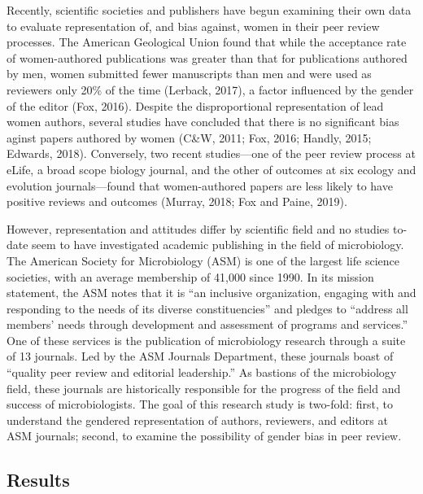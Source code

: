 \documentclass[11pt,]{article}
\begin{document}
Recently, scientific societies and publishers have begun examining their
own data to evaluate representation of, and bias against, women in their
peer review processes. The American Geological Union found that while
the acceptance rate of women-authored publications was greater than that
for publications authored by men, women submitted fewer manuscripts than
men and were used as reviewers only 20\% of the time (Lerback, 2017), a
factor influenced by the gender of the editor (Fox, 2016). Despite the
disproportional representation of lead women authors, several studies
have concluded that there is no significant bias aginst papers authored
by women (C\&W, 2011; Fox, 2016; Handly, 2015; Edwards, 2018).
Conversely, two recent studies---one of the peer review process at
eLife, a broad scope biology journal, and the other of outcomes at six
ecology and evolution journals---found that women-authored papers are
less likely to have positive reviews and outcomes (Murray, 2018; Fox and
Paine, 2019).

However, representation and attitudes differ by scientific field and no
studies to-date seem to have investigated academic publishing in the
field of microbiology. The American Society for Microbiology (ASM) is
one of the largest life science societies, with an average membership of
41,000 since 1990. In its mission statement, the ASM notes that it is
``an inclusive organization, engaging with and responding to the needs
of its diverse constituencies'' and pledges to ``address all members'
needs through development and assessment of programs and services.'' One
of these services is the publication of microbiology research through a
suite of 13 journals. Led by the ASM Journals Department, these journals
boast of ``quality peer review and editorial leadership.'' As bastions
of the microbiology field, these journals are historically responsible
for the progress of the field and success of microbiologists. The goal
of this research study is two-fold: first, to understand the gendered
representation of authors, reviewers, and editors at ASM journals;
second, to examine the possibility of gender bias in peer review.

\subsection{Results}\label{results}
\end{document}
